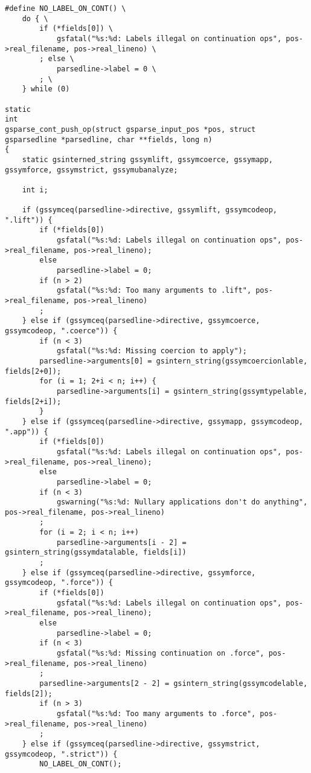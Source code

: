 \documentclass{report}
\begin{document}
\begin{verbatim}
#define NO_LABEL_ON_CONT() \
    do { \
        if (*fields[0]) \
            gsfatal("%s:%d: Labels illegal on continuation ops", pos->real_filename, pos->real_lineno) \
        ; else \
            parsedline->label = 0 \
        ; \
    } while (0)

static
int
gsparse_cont_push_op(struct gsparse_input_pos *pos, struct gsparsedline *parsedline, char **fields, long n)
{
    static gsinterned_string gssymlift, gssymcoerce, gssymapp, gssymforce, gssymstrict, gssymubanalyze;

    int i;

    if (gssymceq(parsedline->directive, gssymlift, gssymcodeop, ".lift")) {
        if (*fields[0])
            gsfatal("%s:%d: Labels illegal on continuation ops", pos->real_filename, pos->real_lineno);
        else
            parsedline->label = 0;
        if (n > 2)
            gsfatal("%s:%d: Too many arguments to .lift", pos->real_filename, pos->real_lineno)
        ;
    } else if (gssymceq(parsedline->directive, gssymcoerce, gssymcodeop, ".coerce")) {
        if (n < 3)
            gsfatal("%s:%d: Missing coercion to apply");
        parsedline->arguments[0] = gsintern_string(gssymcoercionlable, fields[2+0]);
        for (i = 1; 2+i < n; i++) {
            parsedline->arguments[i] = gsintern_string(gssymtypelable, fields[2+i]);
        }
    } else if (gssymceq(parsedline->directive, gssymapp, gssymcodeop, ".app")) {
        if (*fields[0])
            gsfatal("%s:%d: Labels illegal on continuation ops", pos->real_filename, pos->real_lineno);
        else
            parsedline->label = 0;
        if (n < 3)
            gswarning("%s:%d: Nullary applications don't do anything", pos->real_filename, pos->real_lineno)
        ;
        for (i = 2; i < n; i++)
            parsedline->arguments[i - 2] = gsintern_string(gssymdatalable, fields[i])
        ;
    } else if (gssymceq(parsedline->directive, gssymforce, gssymcodeop, ".force")) {
        if (*fields[0])
            gsfatal("%s:%d: Labels illegal on continuation ops", pos->real_filename, pos->real_lineno);
        else
            parsedline->label = 0;
        if (n < 3)
            gsfatal("%s:%d: Missing continuation on .force", pos->real_filename, pos->real_lineno)
        ;
        parsedline->arguments[2 - 2] = gsintern_string(gssymcodelable, fields[2]);
        if (n > 3)
            gsfatal("%s:%d: Too many arguments to .force", pos->real_filename, pos->real_lineno)
        ;
    } else if (gssymceq(parsedline->directive, gssymstrict, gssymcodeop, ".strict")) {
        NO_LABEL_ON_CONT();

\end{verbatim}
\end{document}
